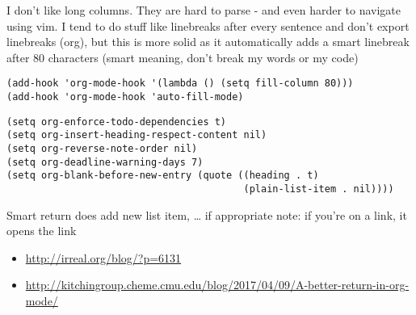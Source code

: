 \documentclass[11pt]{article}
\begin{document}
I don't like long columns. They are hard to parse - and even harder to navigate
using vim. I tend to do stuff like linebreaks after every
sentence and don't export linebreaks (org), but this is more solid as
it automatically adds a smart linebreak after 80 characters (smart meaning,
don't break my words or my code)
\begin{verbatim}
(add-hook 'org-mode-hook '(lambda () (setq fill-column 80)))
(add-hook 'org-mode-hook 'auto-fill-mode)
\end{verbatim}
\begin{verbatim}
(setq org-enforce-todo-dependencies t)
(setq org-insert-heading-respect-content nil)
(setq org-reverse-note-order nil)
(setq org-deadline-warning-days 7)
(setq org-blank-before-new-entry (quote ((heading . t)
                                         (plain-list-item . nil))))
\end{verbatim}
Smart return does add new list item, … if appropriate
note: if you're on a link, it opens the link
\begin{itemize}
\item \url{http://irreal.org/blog/?p=6131}
\item \url{http://kitchingroup.cheme.cmu.edu/blog/2017/04/09/A-better-return-in-org-mode/}
\end{itemize}
\end{document}
